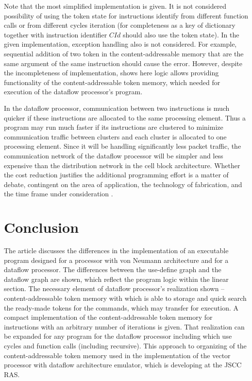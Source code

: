 \documentclass[
11pt,%
tightenlines,%
twoside,%
onecolumn,%
nofloats,%
nobibnotes,%
nofootinbib,%
superscriptaddress,%
noshowpacs,%
centertags]%
{revtex4}
\begin{document}
Note that the most simplified implementation is given.
It is not considered possibility of using the token state for instructions identify from different function calls or from different cycles iteration (for completeness as a key of dictionary together with instruction identifier $CId$ should also use the token state).
In the given implementation, exception handling also is not considered.
For example, sequential addition of two token in the content-addressable memory that are the same argument of the same instruction should cause the error.
However, despite the incompleteness of implementation, shows here logic allows providing functionality of the content-addressable token memory, which needed for execution of the dataflow processor’s program.

In the dataflow processor, communication between two instructions is much quicker if these instructions are allocated to the same processing element.
Thus a program may run much faster if its instructions are clustered to minimize communication traffic between clusters and each cluster is allocated to one processing element.
Since it will be handling significantly less packet traffic, the communication network of the dataflow processor will be simpler and less expensive than the distribution network in the cell block architecture.
Whether the cost reduction justifies the additional programming effort is a matter of debate, contingent on the area of application, the technology of fabrication, and the time frame under consideration \cite{Dennis}.

\section{Conclusion}

The article discusses the differences in the implementation of an executable program designed for a processor with von Neumann architecture and for a dataflow processor.
The differences between the use-define graph and the dataflow graph are shown, which reflect the program logic within the linear section.
The necessary element of dataflow processor’s realization shown -- content-addressable token memory with which is able to storage and quick search the ready-made tokens for the commands, which may transfer for execution.
A compact implementation of the content-addressable token memory for instructions with an arbitrary number of iterations is given.
That realization can be expanded for any program for the dataflow processor including which use cycles and function calls (including recursive).
This approach to organizing of the content-addressable token memory used in the implementation of the vector processor with dataflow architecture emulator, which is developing at the JSCC RAS.
\end{document}
